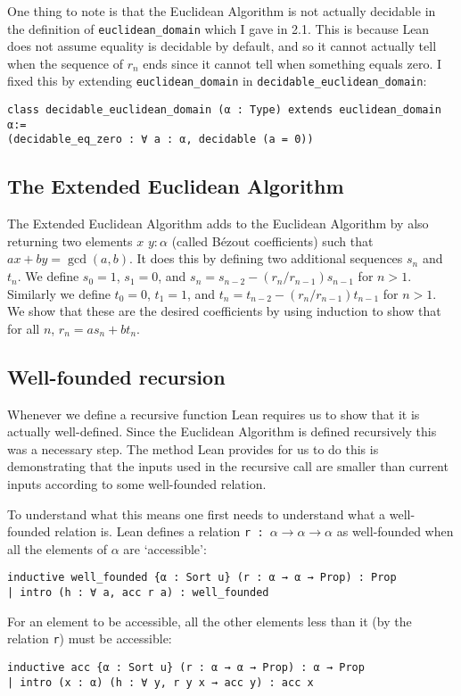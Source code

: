 \documentclass{article}
\renewcommand{\a}{\alpha}
\newcommand{\ct}{\texttt}
\begin{document}
One thing to note is that the Euclidean Algorithm is not actually decidable in the definition of \ct{euclidean\_domain} which I gave in 2.1. %
This is because Lean does not assume equality is decidable by default, and so it cannot actually tell when the sequence of $r_n$ ends since it cannot tell when something equals zero.
I fixed this by extending \ct{euclidean\_domain} in \ct{decidable\_euclidean\_domain}:
\begin{lstlisting}
class decidable_euclidean_domain (α : Type) extends euclidean_domain α:=
(decidable_eq_zero : ∀ a : α, decidable (a = 0))
\end{lstlisting}

\subsection{The Extended Euclidean Algorithm}
The Extended Euclidean Algorithm adds to the Euclidean Algorithm by also returning two elements $x$ $y:\a$ (called B\'ezout coefficients) such that $ax+by=\gcd(a,b)$.
It does this by defining two additional sequences $s_n$ and $t_n$.
We define $s_0=1$, $s_1=0$, and $s_n=s_{n-2}-(r_n/r_{n-1})s_{n-1}$ for $n>1$.
Similarly we define $t_0=0$, $t_1=1$, and $t_n=t_{n-2}-(r_n/r_{n-1})t_{n-1}$ for $n>1$.
We show that these are the desired coefficients by using induction to show that for all $n$, $r_n=as_n+bt_n$.

\subsection{Well-founded recursion}
Whenever we define a recursive function Lean requires us to show that it is actually well-defined. 
Since the Euclidean Algorithm is defined recursively this was a necessary step.
The method Lean provides for us to do this is demonstrating that the inputs used in the recursive call are smaller than current inputs according to some well-founded relation.

To understand what this means one first needs to understand what a well-founded relation is. Lean defines a relation \ct{r : $\a \to \a \to \a$} as well-founded when all the elements of $\a$ are `accessible':
\begin{lstlisting}
inductive well_founded {α : Sort u} (r : α → α → Prop) : Prop
| intro (h : ∀ a, acc r a) : well_founded
\end{lstlisting}
For an element to be accessible, all the other elements less than it (by the relation \ct{r}) must be accessible:
\begin{lstlisting}
inductive acc {α : Sort u} (r : α → α → Prop) : α → Prop
| intro (x : α) (h : ∀ y, r y x → acc y) : acc x
\end{lstlisting}
\end{document}
